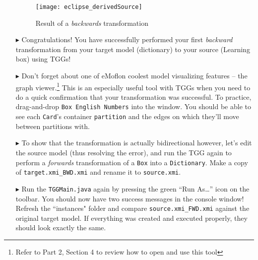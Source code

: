 \begin{itemize}
\vspace{0.5cm}

\begin{figure}[htbp]
\begin{center}
  \texttt{[image: eclipse\_derivedSource]}
  \caption{Result of a \emph{backwards} transformation}
  \label{eclipse:derivedBOX}
\end{center}
\end{figure}

\item[$\blacktriangleright$] Congratulations! You have successfully performed your first \emph{backward} transformation from your target model (dictionary) to
your source (Learning box) using TGGs! 

\newpage

\item[$\blacktriangleright$] Don't forget about one of eMoflon coolest model visualizing features -- the graph viewer.\footnote{Refer to Part 2, Section 4 to
review how to open and use this tool} This is an especially useful tool with TGGs when you need to do a quick confirmation that your transformation was
successful. To practice, drag-and-drop \texttt{Box English Numbers} into the window. You should be able to see each \texttt{Card}'s container
\texttt{partition} and the edges on which they'll move between partitions with. 


\item[$\blacktriangleright$] To show that the transformation is actually bidirectional however, let's edit the source model (thus resolving the error), and run
the TGG again to perform a \emph{forwards} transformation of a \texttt{Box} into a \texttt{Dictionary}. Make a copy of \texttt{target.xmi\_BWD.xmi} and rename
it to \texttt{source.xmi}.

\item[$\blacktriangleright$] Run the \texttt{TGGMain.java} again by pressing the green ``Run As\ldots'' icon on the toolbar. You should now have two success
messages in the console window! Refresh the ``instances" folder and compare \texttt{source.xmi\_FWD.xmi} against the original target model. If everything was
created and executed properly, they should look exactly the same. 

\end{itemize}
